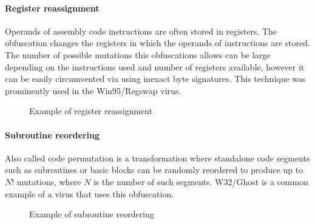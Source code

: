 \paragraph*{Register reassignment}
Operands of assembly code instructions are often stored in registers. The obfuscation changes the registers in which the operands of instructions are stored. The number of possible mutations this obfuscations allows can be large depending on the instructions used and number of registers available, however it can be easily circumvented via using inexact byte signatures. This technique was prominently used in the Win95/Regswap virus.

\begin{figure}[H]
    \centering
    \caption{Example of register reassignment}
    \label{fig_obf_regswap}
\end{figure}

\paragraph*{Subroutine reordering}
Also called code permutation is a transformation where standalone code segments such as subroutines or basic blocks can be randomly reordered to produce up to $N!$ mutations, where $N$ is the number of such segments. W32/Ghost is a common example of a virus that uses this obfuscation.

\begin{figure}[H]
    \centering
    \caption{Example of subroutine reordering}
    \label{fig_obf_perm}
\end{figure}

